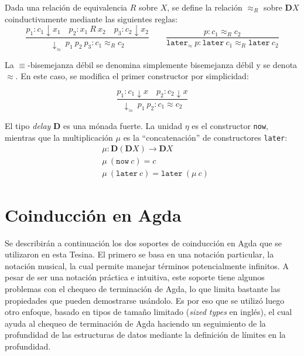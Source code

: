 \begin{definition}
Dada una relación de equivalencia $R$ sobre $X$, se define la relación $\approx_R$ sobre $\mathbf{D}X$ coinductivamente mediante las siguientes reglas:
\begin{equation*}
\dfrac{p_1 : c_1 \downarrow x_1 \quad p_2 : x_1 \ R \ x_2 \quad p_3 : c_2 \downarrow x_2}{\downarrow_{\approx} \ p_1 \ p_2 \ p_3 : c_1 \approx_R c_2}  	\qquad  	\dfrac{p : c_1 \approx_R c_2}{\mathtt{later}_{\approx} \ p : \mathtt{later} \ c_1 \approx_R \mathtt{later} \ c_2}
\end{equation*}
\end{definition}

La $\equiv$-bisemejanza débil se denomina simplemente bisemejanza débil y se denota $\approx$. En este caso, se modifica el primer constructor por simplicidad:

\begin{equation*}
\dfrac{p_1 : c_1 \downarrow x \quad p_2 : c_2 \downarrow x}{\downarrow_{\approx} \ p_1 \ p_2 : c_1 \approx c_2}
\end{equation*}

El tipo \textit{delay} $\mathbf{D}$ es una mónada fuerte. La unidad $\eta$ es el constructor \texttt{now}, mientras que la multiplicación $\mu$ es la ``concatenación'' de constructores \texttt{later}:
\begin{align*}
& \mu : \mathbf{D} (\mathbf{D} X) \rightarrow \mathbf{D} X  \\
& \mu \ (\mathtt{now} \ c) = c \\
& \mu \ (\mathtt{later} \ c) = \mathtt{later} \ (\mu \ c)
\end{align*}


\section{Coinducción en Agda}\label{coind:agda}

Se describirán a continuación los dos soportes de coinducción en Agda que se utilizaron en esta Tesina. El primero se basa en una notación particular, la notación musical, la cual permite manejar términos potencialmente infinitos. A pesar de ser una notación práctica e intuitiva, este soporte tiene algunos problemas con el chequeo de terminación de Agda, lo que limita bastante las propiedades que pueden demostrarse usándolo. Es por eso que se utilizó luego otro enfoque, basado en tipos de tamaño limitado (\textit{sized types} en inglés), el cual ayuda al chequeo de terminación de Agda haciendo un seguimiento de la profundidad de las estructuras de datos mediante la definición de límites en la profundidad. 

